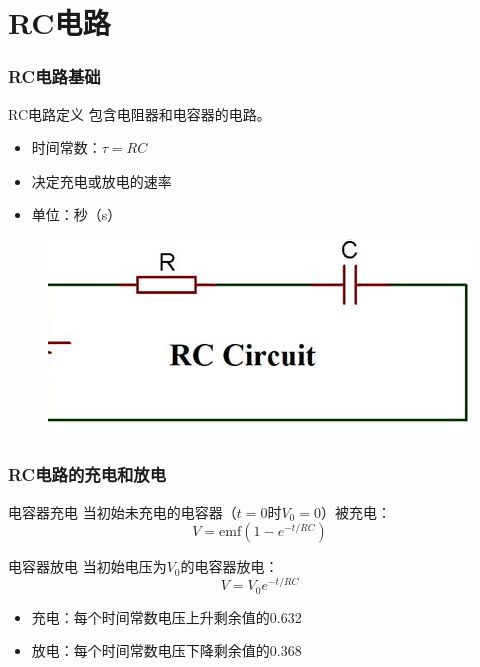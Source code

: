 \documentclass{beamer}
\begin{document}
\section{RC电路}
\begin{frame}
    \frametitle{RC电路基础}
    \begin{block}{RC电路定义}
        包含电阻器和电容器的电路。
    \end{block}
    \begin{itemize}
        \item 时间常数：$\tau = RC$
        \item 决定充电或放电的速率
        \item 单位：秒（s）
    \end{itemize}
    \begin{figure}
        \centering
        \includegraphics[width=0.65\linewidth]{phys12-circuits-kirchhoffs-junction-rule.jpg}
    \end{figure}
\end{frame}

\begin{frame}
    \frametitle{RC电路的充电和放电}
    \begin{block}{电容器充电}
        当初始未充电的电容器（$t = 0$时$V_0 = 0$）被充电：
        \[ V = \text{emf}(1-e^{-t/RC}) \]
    \end{block}
    \begin{block}{电容器放电}
        当初始电压为$V_0$的电容器放电：
        \[ V = V_0e^{-t/RC} \]
    \end{block}
    \begin{itemize}
        \item 充电：每个时间常数电压上升剩余值的0.632
        \item 放电：每个时间常数电压下降剩余值的0.368
    \end{itemize}
\end{frame}
\end{document}
